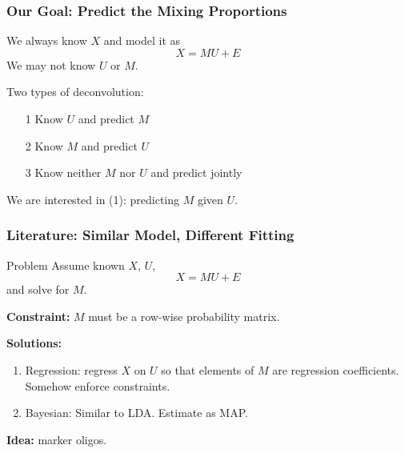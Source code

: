 \documentclass{beamer}
\begin{document}
\begin{frame}
  \frametitle{Our Goal: Predict the Mixing Proportions}
  We always know $X$ and model it as
  \[
  X = MU+E
  \]
  We may not know $U$ or $M$.\newline
  
Two types of deconvolution:\newline
  {\color{blue}{\bf Partial Deconvolution}}
  \begin{enumerate}
  \item[1] Know $U$ and predict $M$
  \item[2] Know $M$ and predict $U$
  \end{enumerate}
  
  {\color{blue}{\bf Full Deconvolution}}
  \begin{enumerate}
  \item[3] Know neither $M$ nor $U$ and predict jointly
  \end{enumerate}

  \begin{center}
    {\Large {\color{blue}We are interested in (1): predicting $M$ given $U$.}}
    \end{center}

\end{frame}

\begin{frame}
  \frametitle{Literature: Similar Model, Different Fitting}
  \begin{block}{Problem}
    Assume known $X$, $U$,
    \[
    X = MU + E
    \]
    and solve for $M$.

    {\bf Constraint:} $M$ must be a row-wise probability matrix. 
  \end{block}

  {\bf Solutions:}
  \begin{enumerate}
  \item {\color{blue}Regression}: regress $X$ on $U$ so that elements of $M$ are regression coefficients. Somehow enforce constraints.
  \item {\color{blue}Bayesian}: Similar to LDA. Estimate as MAP. 
  \end{enumerate}

  \begin{center}
    {\Large {\bf Idea:} {\color{blue} marker oligos}.}
    \end{center}
\end{frame}
\end{document}
